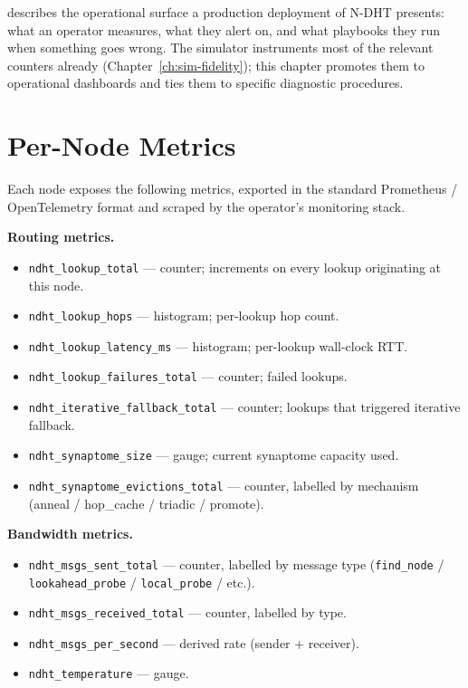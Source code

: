 \documentclass[twoside,nobib]{tufte-book}
\newcommand{\NDHT}{N-DHT\xspace}
\begin{document}
 describes the operational surface a
production deployment of \NDHT presents: what an operator
measures, what they alert on, and what playbooks they run when
something goes wrong. The simulator instruments most of the
relevant counters already
(Chapter~\ref{ch:sim-fidelity}); this chapter promotes them to
operational dashboards and ties them to specific diagnostic
procedures.

\section{Per-Node Metrics}

Each node exposes the following metrics, exported in the standard
Prometheus / OpenTelemetry format and scraped by the operator's
monitoring stack.

\textbf{Routing metrics.}

\begin{itemize}\setlength\itemsep{0.1em}
  \item \texttt{ndht\_lookup\_total} --- counter; increments
    on every lookup originating at this node.
  \item \texttt{ndht\_lookup\_hops} --- histogram; per-lookup
    hop count.
  \item \texttt{ndht\_lookup\_latency\_ms} --- histogram;
    per-lookup wall-clock RTT.
  \item \texttt{ndht\_lookup\_failures\_total} --- counter;
    failed lookups.
  \item \texttt{ndht\_iterative\_fallback\_total} --- counter;
    lookups that triggered iterative fallback.
  \item \texttt{ndht\_synaptome\_size} --- gauge; current
    synaptome capacity used.
  \item \texttt{ndht\_synaptome\_evictions\_total} --- counter,
    labelled by mechanism (anneal / hop\_cache / triadic /
    promote).
\end{itemize}

\textbf{Bandwidth metrics.}

\begin{itemize}\setlength\itemsep{0.1em}
  \item \texttt{ndht\_msgs\_sent\_total} --- counter, labelled
    by message type (\texttt{find\_node} /
    \texttt{lookahead\_probe} / \texttt{local\_probe} / etc.).
  \item \texttt{ndht\_msgs\_received\_total} --- counter,
    labelled by type.
  \item \texttt{ndht\_msgs\_per\_second} --- derived rate
    (sender + receiver).
  \item \texttt{ndht\_temperature} --- gauge.
\end{itemize}
\end{document}
